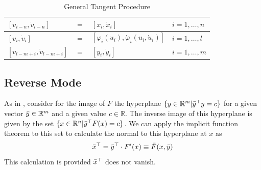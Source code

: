 \documentclass{article}
\begin{document}
\begin{table}[h]
    \centering
    \begin{tabular}{|lcll|}
        \hline
        $[v_{i-n}, \Dot{v}_{i-n}]$ & $=$ & $[x_{i}, \Dot{x}_{i}]$ & $i = 1, \ldots, n$ \\
        \hline
        $[v_{i}, \Dot{v}_{i}]$ & $=$ & $[\varphi_i (u_i), \Dot{\varphi}_i(u_i, \Dot{u}_i)]$ & $i = 1, \ldots, l$ \\
        \hline
        $[v_{l-m+i}, \Dot{v}_{l-m+i}]$ & $=$ & $[y_{i}, \Dot{y}_{i}]$ & $i = 1, \ldots, m$ \\
        \hline
    \end{tabular}
    \caption{General Tangent Procedure}
    \label{tab:gtp}
\end{table}

\subsection{Reverse Mode}

As in \cite{dhamarticle}, consider for the image of $F$ the hyperplane $\{ y \in \mathbb{R}^m | \Bar{y}^\top y = c\}$ for a given vector $\Bar{y} \in \mathbb{R}^m$ and a given value $c \in \mathbb{R}$. The inverse image of this hyperplane is given by the set $\{ x \in \mathbb{R}^n | \Bar{y}^\top F(x) = c\}$. We can apply the implicit function theorem to this set to calculate the normal to this hyperplane at $x$ as
\begin{equation}
    \Bar{x}^\top = \Bar{y}^\top \cdot F'(x) \equiv \Bar{F}(x, \Bar{y})
\end{equation}
This calculation is provided $\Bar{x}^\top$ does not vanish.
\end{document}
